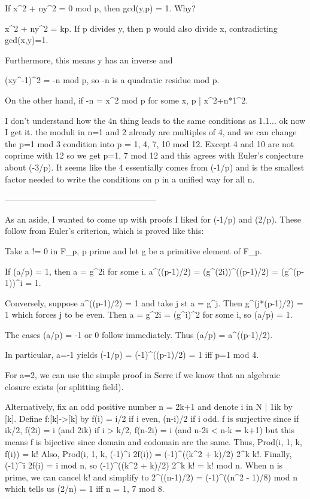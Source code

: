 If x^2 + ny^2 = 0 mod p, then gcd(y,p) = 1. Why?

x^2 + ny^2 = kp. If p divides y, then p would also divide x,
contradicting gcd(x,y)=1.

Furthermore, this means y has an inverse and

(xy^-1)^2 = -n mod p, so -n is a quadratic residue mod p.

On the other hand, if -n = x^2 mod p for some x, p | x^2+n*1^2.

I don't understand how the 4n thing leads to the same conditions as 1.1... ok now I get it. the moduli in n=1 and 2 already are multiples of 4, and we can change the p=1 mod 3 condition into p = 1, 4, 7, 10 mod 12. Except 4 and 10 are not coprime with 12 so we get p=1, 7 mod 12 and this agrees with Euler's conjecture about (-3/p). It seems like the 4 essentially comes from (-1/p) and is the smallest factor needed to write the conditions on p in a unified way for all n.

------------------------------------------------------

As an aside, I wanted to come up with proofs I liked for (-1/p) and (2/p). These follow from Euler's criterion, which is proved like this:

  Take a != 0 in F_p, p prime and let g be a primitive element of F_p.

  If (a/p) = 1, then a = g^{2i} for some i.
  a^((p-1)/2) = (g^(2i))^((p-1)/2) = (g^(p-1))^i = 1.

  Conversely, suppose a^((p-1)/2) = 1 and take j st a = g^j.
  Then g^(j*(p-1)/2) = 1 which forces j to be even. Then a = g^2i = (g^i)^2 for some i, so (a/p) = 1.

  The cases (a/p) = -1 or 0 follow immediately. Thus (a/p) = a^((p-1)/2).

In particular, a=-1 yields (-1/p) = (-1)^((p-1)/2) = 1 iff p=1 mod 4.

For a=2, we can use the simple proof in Serre if we know that an algebraic closure exists (or splitting field).

Alternatively, fix an odd positive number n = 2k+1 and denote {i in N | 1\leq i\leq k} by [k].
Define f:[k]->[k] by f(i) = i/2 if i even, (n-i)/2 if i odd.
f is surjective since if i\leq k/2, f(2i) = i (and 2i\leq k)
                      if i > k/2, f(n-2i) = i (and n-2i < n-k = k+1)
but this means f is bijective since domain and codomain are the same.
Thus, Prod(i, 1, k, f(i)) = k!
Also, Prod(i, 1, k, (-1)^i 2f(i)) = (-1)^((k^2 + k)/2) 2^k k!.
Finally, (-1)^i 2f(i) = i mod n, so (-1)^((k^2 + k)/2) 2^k k! = k! mod n.
When n is prime, we can cancel k! and simplify to
2^((n-1)/2) = (-1)^((n^2 - 1)/8) mod n which tells us (2/n) = 1 iff n = 1, 7 mod 8.

